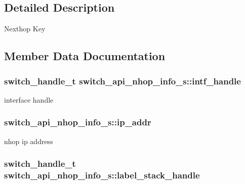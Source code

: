 \subsection{Detailed Description}
Nexthop Key 

\subsection{Member Data Documentation}
\hypertarget{structswitch__api__nhop__info__s_ab2216011f321eeb1bd4c37170e0a1a9e}{
\subsubsection[{intf\+\_\+handle}]{\setlength{\rightskip}{0pt plus 5cm}switch\+\_\+handle\+\_\+t switch\+\_\+api\+\_\+nhop\+\_\+info\+\_\+s\+::intf\+\_\+handle}}\label{structswitch__api__nhop__info__s_ab2216011f321eeb1bd4c37170e0a1a9e}
interface handle \hypertarget{structswitch__api__nhop__info__s_a40056a7bb1a4659b5f9a6b0c19e7fbd9}{
\subsubsection[{ip\+\_\+addr}]{ switch\+\_\+api\+\_\+nhop\+\_\+info\+\_\+s\+::ip\+\_\+addr}}\label{structswitch__api__nhop__info__s_a40056a7bb1a4659b5f9a6b0c19e7fbd9}
nhop ip address \hypertarget{structswitch__api__nhop__info__s_a52ff3a394856378ca29fd3ebcea2fcbf}{
\subsubsection[{label\+\_\+stack\+\_\+handle}]{\setlength{\rightskip}{0pt plus 5cm}switch\+\_\+handle\+\_\+t switch\+\_\+api\+\_\+nhop\+\_\+info\+\_\+s\+::label\+\_\+stack\+\_\+handle}}\label{structswitch__api__nhop__info__s_a52ff3a394856378ca29fd3ebcea2fcbf}
